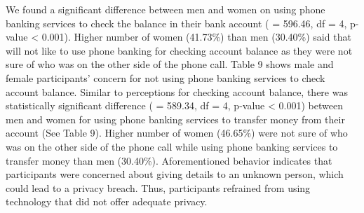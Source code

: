 We found a significant difference between men and women on using phone banking services to check the balance in their bank account ( = 596.46, df = 4, p-value < 0.001). Higher number of women (41.73\%) than men (30.40\%) said that will not like to use phone banking for checking account balance as they were not sure of who was on the other side of the phone call. Table 9 shows male and female participants' concern for not using phone banking services to check account balance. Similar to perceptions for checking account balance, there was statistically significant difference ( =  589.34, df = 4, p-value < 0.001) between men and women for using phone banking services to transfer money from their account (See Table 9). Higher number of women (46.65\%) were not sure of who was on the other side of the phone call while using phone banking services to transfer money than men (30.40\%). Aforementioned behavior indicates that participants were concerned about giving details to an unknown person, which could lead to a privacy breach. Thus, participants refrained from using technology that did not offer adequate privacy.



